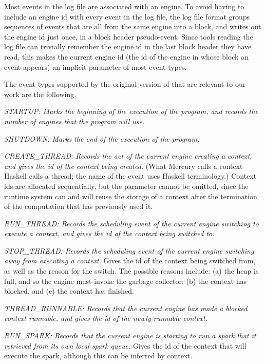 Most events in the log file are associated with an engine.
To avoid having to include an engine id with every event in the log file,
the log file format
groups sequences of events that are all from the same engine into a block,
and writes out the engine id just once, in a block header pseudo-event.
Since tools reading the log file can trivially remember
the engine id in the last block header they have read,
this makes the current engine id
(the id of the engine in whose block an event appears)
an implicit parameter of most event types.

The event types supported by the original version of \tscope 
that are relevant to our work are the following.

\emph{STARTUP:
Marks the beginning of the execution of the program,
and records the number of engines that the program will use.}

\emph{SHUTDOWN:
Marks the end of the execution of the program.}

\emph{CREATE\_THREAD:
Records the act of the current engine creating a context,
and gives the id of the context being created.}
(What Mercury calls a context Haskell calls a thread;
the name of the event uses Haskell terminology.)
Context ids are allocated sequentially,
but the parameter cannot be omitted,
since the runtime system can and will reuse the storage of a context
after the termination of the computation that has previously used it.

\emph{RUN\_THREAD:
Records the scheduling event
of the current engine switching to execute a context,
and gives the id of the context being switched to.}

\emph{STOP\_THREAD:
Records the scheduling event
of the current engine switching away from executing a context.}
Gives the id of the context being switched from,
as well as the reason for the switch.
The possible reasons include:
(a) the heap is full, and so the engine must invoke the garbage collector;
(b) the context has blocked, and
(c) the context has finished.

\emph{THREAD\_RUNNABLE:
Records that the current engine has made a blocked context runnable,
and gives the id of the newly-runnable context.}

\emph{RUN\_SPARK:
Records that the current engine is starting to run a spark
that it retrieved from its own local spark queue.}
Gives the id of the context that will execute the spark,
although this can be inferred by context.

